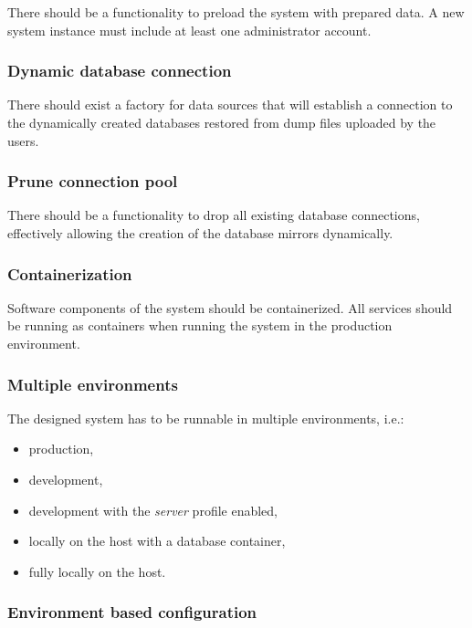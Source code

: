 \documentclass[a4paper,twoside,12pt]{book}
\begin{document}
There should be a functionality to preload the system with prepared data. A new system instance must include at least one administrator account.

\subsubsection{Dynamic database connection}

There should exist a factory for data sources that will establish a connection to the dynamically created databases restored from dump files uploaded by the users.

\subsubsection{Prune connection pool}

There should be a functionality to drop all existing database connections, effectively allowing the creation of the database mirrors dynamically.

\subsubsection{Containerization}

Software components of the system should be containerized. All services should be running as containers when running the system in the production environment.

\subsubsection{Multiple environments}

The designed system has to be runnable in multiple environments, i.e.:

\begin{itemize}
\item production,
\item development,
\item development with the \textit{server} profile enabled,
\item locally on the host with a database container,
\item fully locally on the host.
\end{itemize}

\subsubsection{Environment based configuration}
\end{document}
